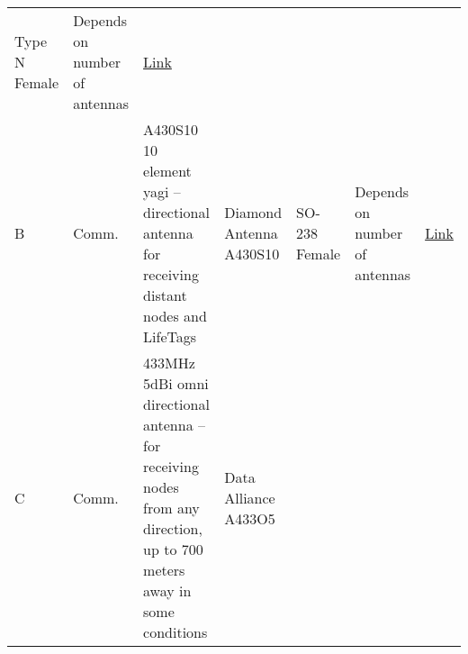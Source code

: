 \documentclass[
]{article}
\begin{document}
\begin{longtable}[]{@{}lllllll@{}}
\begin{minipage}[t]{0.12\columnwidth}
Type N Female\strut
\end{minipage} & \begin{minipage}[t]{0.12\columnwidth}\raggedright
Depends on number of antennas\strut
\end{minipage} & \begin{minipage}[t]{0.12\columnwidth}\raggedright
\href{https://www.hamradio.com/detail.cfm?pid=H0-000720}{Link}\strut
\end{minipage}\tabularnewline
\begin{minipage}[t]{0.12\columnwidth}\raggedright
B\strut
\end{minipage} & \begin{minipage}[t]{0.12\columnwidth}\raggedright
Comm.\strut
\end{minipage} & \begin{minipage}[t]{0.12\columnwidth}\raggedright
A430S10 10 element yagi -- directional antenna for receiving distant
nodes and LifeTags\strut
\end{minipage} & \begin{minipage}[t]{0.12\columnwidth}\raggedright
Diamond Antenna A430S10\strut
\end{minipage} & \begin{minipage}[t]{0.12\columnwidth}\raggedright
SO-238 Female\strut
\end{minipage} & \begin{minipage}[t]{0.12\columnwidth}\raggedright
Depends on number of antennas\strut
\end{minipage} & \begin{minipage}[t]{0.12\columnwidth}\raggedright
\href{https://www.hamradio.com/detail.cfm?pid=H0-005816}{Link}\strut
\end{minipage}\tabularnewline
\begin{minipage}[t]{0.12\columnwidth}\raggedright
C\strut
\end{minipage} & \begin{minipage}[t]{0.12\columnwidth}\raggedright
Comm.\strut
\end{minipage} & \begin{minipage}[t]{0.12\columnwidth}\raggedright
433MHz 5dBi omni directional antenna -- for receiving nodes from any
direction, up to 700 meters away in some conditions\strut
\end{minipage} & \begin{minipage}[t]{0.12\columnwidth}\raggedright
Data Alliance A433O5\strut
\end{minipage} & \begin{minipage}[t]{0.12\columnwidth}\raggedright

\end{minipage}
\end{longtable}
\end{document}
